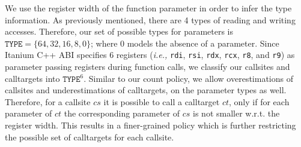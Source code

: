 % 
% 

We use the register width of the function parameter in order to infer the type information. As previously mentioned, there are 4 types 
of reading and writing accesses. Therefore, our set of possible types for parameters is $\texttt{TYPE} = \{64, 32, 16, 8, 0\}$; where 0 models the absence of a 
parameter. Since Itanium C++ ABI specifies 6 registers (\textit{i.e.,} \texttt{rdi}, \texttt{rsi}, \texttt{rdx}, \texttt{rcx}, \texttt{r8}, and \texttt{r9}) as 
parameter passing registers during function calls, we classify our callsites and calltargets into $\texttt{TYPE}^6$. Similar to
our count policy, we allow overestimations of callsites and underestimations of calltargets, on the parameter types as well. Therefore, for a 
callsite $cs$ it is possible to call a calltarget $ct$, only if for each parameter of $ct$ the corresponding parameter of $cs$ is not smaller w.r.t. the register width.
This results in a finer-grained policy which is further restricting the possible set of calltargets for each callsite.


